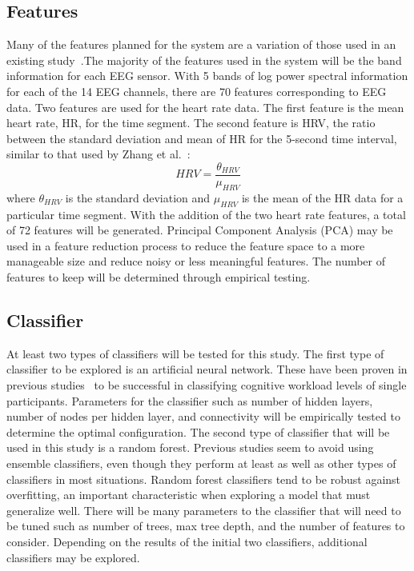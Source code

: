 \documentclass[11pt]{article}
\begin{document}
\subsection{Features}
Many of the features planned for the system are a variation of those used in an existing study~\cite{Wilson}.The majority of the features used in the system will be the band information for each EEG sensor. With 5 bands of log power spectral information for each of the 14 EEG channels, there are 70 features corresponding to EEG data. Two features are used for the heart rate data. The first feature is the mean heart rate, HR, for the time segment. The second feature is HRV, the ratio between the standard deviation and mean of HR for the 5-second time interval, similar to that used by Zhang et al.~\cite{Zhang}: \[HRV = \frac{\theta_{HRV}}{\mu_{HRV}}\] where \( \theta_{HRV} \) is the standard deviation and \( \mu_{HRV}\) is the mean of the HR data for a particular time segment. With the addition of the two heart rate features, a total of 72 features will be generated. Principal Component Analysis (PCA) may be used in a feature reduction process to reduce the feature space to a more manageable size and reduce noisy or less meaningful features. The number of features to keep will be determined through empirical testing.

\subsection{Classifier}
At least two types of classifiers will be tested for this study.  The first type of classifier to be explored is an artificial neural network. These have been proven in previous studies~\cite{Wilson} to be successful in classifying cognitive workload levels of single participants. Parameters for the classifier such as number of hidden layers, number of nodes per hidden layer, and connectivity will be empirically tested to determine the optimal configuration. The second type of classifier that will be used in this study is a random forest. Previous studies seem to avoid using ensemble classifiers, even though they perform at least as well as other types of classifiers in most situations. Random forest classifiers tend to be robust against overfitting, an important characteristic when exploring a model that must generalize well. There will be many parameters to the classifier that will need to be tuned such as number of trees, max tree depth, and the number of features to consider. Depending on the results of the initial two classifiers, additional classifiers may be explored.  
\end{document}
